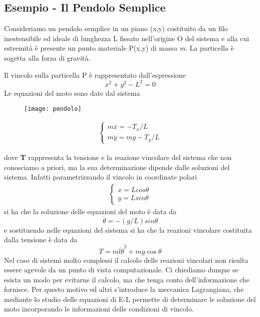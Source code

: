 \subsection*{Esempio - Il Pendolo Semplice}

Consideriamo un pendolo semplice in un piano (x,y) costituito da un filo inestensibile ed ideale di lunghezza L fissato nell'origine O del sistema e alla cui estremit\`{a} \`{e} presente un punto materiale P(x,y) di massa \textit{m}. La particella \`{e} sogetta alla forza di gravit\`{a}.
\newline 

\noindent Il vincolo sulla particella P \`{e} rappresentato dall'espressione 
\begin{equation*}
	x^2+y^2 - L^2 = 0
\end{equation*}
Le equazioni del moto sono date dal sistema 

\begin{figure}[!ht]
\centering
\begin{minipage}{.5\textwidth}
  \centering
  \texttt{[image: pendolo]}
\end{minipage}%
\begin{minipage}{.5\textwidth}
 	\begin{align*}
 		\left \{ \begin{array}{l}
 			 m\ddot{x} = - T_{x}/L \\[0.1in]
 			 m\ddot{y} = mg - T_y/L
 		\end{array} \right.
 	\end{align*}
\end{minipage}
\end{figure}
dove \textbf{T} rappresenta la tensione e la reazione vincolare del sistema che non conosciamo a priori, ma la sua determinazione dipende dalle soluzioni del sistema. Infatti parametrizzando il vincolo in coordinate polari 
	\begin{align*}
 		\left \{ \begin{array}{l}
 			 x = Lcos\theta\\[0.1in]
 			 y = Lsin\theta
 		\end{array} \right.
 	\end{align*}
si ha che la soluzione delle equazioni del moto \`{e} data da 
\begin{equation*}
	\ddot{\theta} = - (g/L)sin\theta 
\end{equation*} 
e sostituendo nelle equazioni del sistema si ha che la reazioni vincolare costituita dalla tensione \`{e} data da 
\begin{equation*}
	T=m l \dot{\theta}^2+m g \cos \theta
\end{equation*}
Nel caso di sistemi molto complessi il calcolo delle reazioni vincolari non risulta essere agevole da un punto di vista computazionale. Ci chiediamo dunque se esista un modo per evitarne il calcolo, ma che tenga conto dell'informazione che fornisce. Per questo motivo ed altri s'introduce la meccanica Lagrangiana, che mediante lo studio delle equazioni di E-L permette di determinare le soluzione del moto incorporando le informazioni delle condizioni di vincolo.

